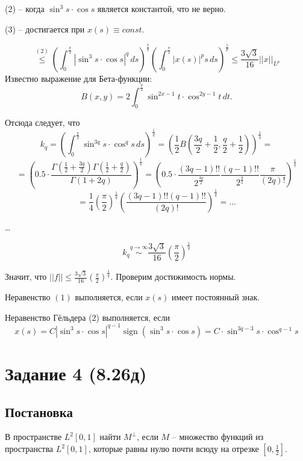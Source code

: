 \documentclass[14pt, a4paper, titlepage, fleqn]{extarticle}
\DeclareMathOperator{\sign}{sign}
\begin{document}
        (2) -- когда \( \sin^3 s \cdot \cos s \) является константой, что не верно. 

        (3) -- достигается при \( x(s) \equiv const \).


        \pagebreak
        \[
            \stackrel{(2)}{\leq} \left( \int_0^\frac{\pi}{2} \left| \sin^3 s \cdot \cos s \right|^q \, ds \right)^{\frac{1}{q}} \left( \int_0^\frac{\pi}{2} |x(s)|^p s \, ds \right)^{\frac{1}{p}} \leq \frac{3 \sqrt{3}}{16} ||x||_{L^p}
        \]
        Известно выражение для Бета-функции:
        \[
            B(x, y) = 2 \int_{0}^{\frac{\pi}{2}} \sin^{2x-1} t \cdot \cos^{2y-1} t \, dt.
        \]

        Отсюда следует, что
        \[
            k_q = \left( \int_0^\frac{\pi}{2} \sin^{3q} s \cdot \cos^{q} s \, ds \right)^{\frac{1}{q}} = 
            \left( \frac{1}{2} B\left(\frac{3q}{2} + \frac{1}{2}, \frac{q}{2}+\frac{1}{2}\right) \right)^{\frac{1}{q}} = 
        \]
        \[
            = \left( 0.5 \cdot \frac{\Gamma\left(\frac{1}{2} + \frac{3q}{2}\right) \Gamma\left(\frac{1}{2} + \frac{q}{2}\right)}{\Gamma\left(1 + 2q\right)} \right)^{\frac{1}{q}}
            = \left( 0.5 \cdot \frac{(3q-1)!!}{2^\frac{3q}{2}} \frac{(q-1)!!}{2^\frac{q}{2}} \frac{\pi}{\left(2q\right)!} \right)^{\frac{1}{q}}
        \]
        \[
            = \frac{1}{4}  \left( \frac{\pi}{2} \right)^{\frac{1}{q}} \left( \frac{(3q-1)!! (q-1)!! }{\left(2q\right)!} \right)^{\frac{1}{q}} = \dots
        \]

        \dots

        \[
            k_q \stackrel{q \to \infty}{\sim} \frac{3 \sqrt{3}}{16}  \left( \frac{\pi}{2} \right)^{\frac{1}{q}}
        \]

        Значит, что \( ||f|| \leq \frac{3 \sqrt{3}}{16} \left( \frac{\pi}{2} \right)^{\frac{1}{q}} \). Проверим достижимость нормы.
        
        Неравенство \( (1) \) выполняется, если  \( x(s) \) имеет постоянный знак.

        Неравенство Гёльдера (2) выполняется, если
        \[
            x(s) = C |\sin^3 s \cdot \cos s|^{q-1} \sign(\sin^3 s \cdot \cos s) = C \cdot \sin^{3q - 3} s \cdot \cos^{q-1} s
        \]
    

    \pagebreak
    \section{Задание 4 (8.26д)}

        \subsection{Постановка}
        В пространстве \( L^2 [ 0, 1 ] \) найти \( M^\perp \), если \( M \) -- множество функций из пространства \( L^2[0, 1] \), которые равны нулю почти всюду на отрезке \( \left[ 0, \frac{1}{2} \right] \).
        
\end{document}
